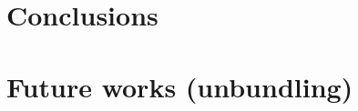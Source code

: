 \section{Conclusions}
\label{sec:Conclusions}

\section{Future works (unbundling)}
\label{sec:FutureWorks}
